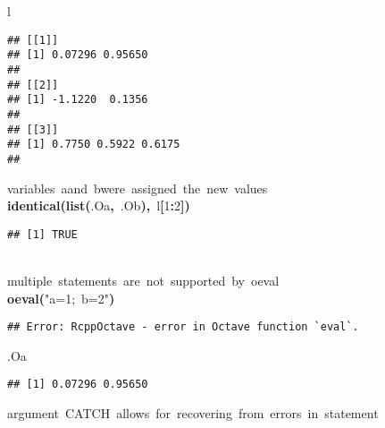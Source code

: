 \documentclass[english,10pt,a4paper]{article}\usepackage{graphicx, color}
\makeatletter
\newcommand{\hlnumber}[1]{\textcolor[rgb]{0,0,0}{#1}}%
\newcommand{\hlfunctioncall}[1]{\textcolor[rgb]{0.501960784313725,0,0.329411764705882}{\textbf{#1}}}%
\newcommand{\hlstring}[1]{\textcolor[rgb]{0.6,0.6,1}{#1}}%
\newcommand{\hlkeyword}[1]{\textcolor[rgb]{0,0,0}{\textbf{#1}}}%
\newcommand{\hlcomment}[1]{\textcolor[rgb]{0.180392156862745,0.6,0.341176470588235}{#1}}%
\newcommand{\hlsymbol}[1]{\textcolor[rgb]{0,0,0}{#1}}%
\newcommand{\hlstd}[1]{\textcolor[rgb]{0,0,0}{#1}}%
\newenvironment{kframe}{%
 \def\FrameCommand##1{\hskip\@totalleftmargin \hskip-\fboxsep
 \colorbox{shadecolor}{##1}\hskip-\fboxsep
     \hskip-\linewidth \hskip-\@totalleftmargin \hskip\columnwidth}%
 \MakeFramed {\advance\hsize-\width
   \@totalleftmargin\z@ \linewidth\hsize
   \@setminipage}}%
 {\par\unskip\endMakeFramed}
\newenvironment{knitrout}{}{} %
\makeatother
\begin{document}
\begin{knitrout}
\begin{kframe}
\begin{flushleft}
\hlstd{}\hlsymbol{l}\mbox{}
\normalfont
\end{flushleft}
\begin{verbatim}
## [[1]]
## [1] 0.07296 0.95650
## 
## [[2]]
## [1] -1.1220  0.1356
## 
## [[3]]
## [1] 0.7750 0.5922 0.6175
## 
\end{verbatim}
\begin{flushleft}
\ttfamily\noindent
\hlcomment{\usebox{\hlnormalsizeboxhash}{\ }variables{\ }\usebox{\hlnormalsizeboxsinglequote}a\usebox{\hlnormalsizeboxsinglequote}{\ }and{\ }\usebox{\hlnormalsizeboxsinglequote}b\usebox{\hlnormalsizeboxsinglequote}{\ }were{\ }assigned{\ }the{\ }new{\ }values}\hspace*{\fill}\\
\hlstd{}\hlfunctioncall{identical}\hlkeyword{(}\hlfunctioncall{list}\hlkeyword{(}\hlsymbol{.O}\hlkeyword{\usebox{\hlnormalsizeboxdollar}}\hlsymbol{a}\hlkeyword{,}{\ }\hlsymbol{.O}\hlkeyword{\usebox{\hlnormalsizeboxdollar}}\hlsymbol{b}\hlkeyword{)}\hlkeyword{,}{\ }\hlsymbol{l}\hlkeyword{[}\hlnumber{1}\hlkeyword{:}\hlnumber{2}\hlkeyword{]}\hlkeyword{)}\mbox{}
\normalfont
\end{flushleft}
\begin{verbatim}
## [1] TRUE
\end{verbatim}
\begin{flushleft}
\ttfamily\noindent
\hspace*{\fill}\\
\hlstd{}\hlcomment{\usebox{\hlnormalsizeboxhash}{\ }multiple{\ }statements{\ }are{\ }not{\ }supported{\ }by{\ }o\usebox{\hlnormalsizeboxunderscore}eval}\hspace*{\fill}\\
\hlstd{}\hlfunctioncall{o\usebox{\hlnormalsizeboxunderscore}eval}\hlkeyword{(}\hlstring{"{}a=1;{\ }b=2"{}}\hlkeyword{)}\mbox{}
\normalfont
\end{flushleft}
\begin{verbatim}
## Error: RcppOctave - error in Octave function `eval`.
\end{verbatim}
\begin{flushleft}
\ttfamily\noindent
\hlsymbol{.O}\hlkeyword{\usebox{\hlnormalsizeboxdollar}}\hlsymbol{a}\mbox{}
\normalfont
\end{flushleft}
\begin{verbatim}
## [1] 0.07296 0.95650
\end{verbatim}
\begin{flushleft}
\ttfamily\noindent
\hlcomment{\usebox{\hlnormalsizeboxhash}{\ }argument{\ }CATCH{\ }allows{\ }for{\ }recovering{\ }from{\ }errors{\ }in{\ }statement}\hspace*{\fill}\\

\end{flushleft}
\end{kframe}
\end{knitrout}
\end{document}
